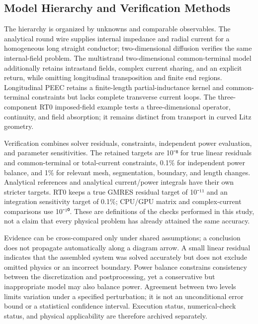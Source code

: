 \documentclass[journal,10pt]{IEEEtran}
\begin{document}
\subsection*{Model Hierarchy and Verification Methods}
\hypertarget{02.hierarchy.heading}{}
The hierarchy is organized by unknowns and comparable observables. The analytical round wire supplies internal impedance and radial current for a homogeneous long straight conductor; two-dimensional diffusion verifies the same internal-field problem. The multistrand two-dimensional common-terminal model additionally retains intrastand fields, complex current sharing, and an explicit return, while omitting longitudinal transposition and finite end regions. Longitudinal PEEC retains a finite-length partial-inductance kernel and common-terminal constraints but lacks complete transverse current loops. The three-component RT0 imposed-field example tests a three-dimensional operator, continuity, and field absorption; it remains distinct from transport in curved Litz geometry.


Verification combines solver residuals, constraints, independent power evaluation, and parameter sensitivities. The retained targets are 10⁻⁸ for true linear residuals and common-terminal or total-current constraints, 0.1\% for independent power balance, and 1\% for relevant mesh, segmentation, boundary, and length changes. Analytical references and analytical current/power integrals have their own stricter targets. RT0 keeps a true GMRES residual target of 10⁻¹¹ and an integration sensitivity target of 0.1\%; CPU/GPU matrix and complex-current comparisons use 10⁻¹⁰. These are definitions of the checks performed in this study, not a claim that every physical problem has already attained the same accuracy.


Evidence can be cross-compared only under shared assumptions; a conclusion does not propagate automatically along a diagram arrow. A small linear residual indicates that the assembled system was solved accurately but does not exclude omitted physics or an incorrect boundary. Power balance constrains consistency between the discretization and postprocessing, yet a conservative but inappropriate model may also balance power. Agreement between two levels limits variation under a specified perturbation; it is not an unconditional error bound or a statistical confidence interval. Execution status, numerical-check status, and physical applicability are therefore archived separately.
\end{document}
